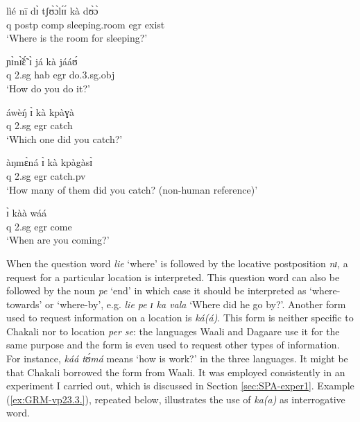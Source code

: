 \begin{exe}
\begin{exe}
\begin{exe}
{\begin{exe}
\begin{exe}
\begin{exe}
\begin{exe}
\begin{exe}
\begin{exe}
\begin{exe}
\begin{xlist}
\begin{exe}
\ex\label{ex:vp9.25}
\gll lìé nī dɪ̀ tʃʊ̀ɔ̀lɪ́ɪ́ kà dʊ̀ɔ̀ \\
        {\sc q} {\sc postp} {\sc comp} sleeping.room   {\sc egr} exist \\
\glt  `Where is the room for sleeping?' 



\ex\label{ex:vp22.4.1}
\gll ɲɪ̀nɪ̃̀ɛ̃́ ɪ̀ já kà jááʊ́ \\
      {\sc q}  {\sc 2.sg} {\sc hab}   {\sc egr} do.{\sc 3.sg.obj} \\
\glt  `How do you do it?' 



\ex\label{ex:vp22.4.4}
\gll áwèŋ́ ɪ̀ kà kpàɣà \\
      {\sc q}   {\sc 2.sg}  {\sc  egr}    catch  \\
\glt  `Which one did you catch?' 


\ex\label{ex:vp22.4.10}
\gll àŋmɛ̀ná ɪ̀ kà kpàgàsɪ̀ \\
         {\sc q}    {\sc 2.sg}  {\sc  egr}  catch.{\sc pv}  \\
\glt  `How many of them did you catch? (non-human reference)' 

\ex\label{ex:vp22.4.15}
 ɪ̀ kàà wáá \\
       {\sc q} {\sc 2.sg} {\sc  egr}    come \\
\glt  `When are you coming?' 
  
   
  \z 
 \z


When the question word {\it lie} `where' is  followed by the locative
postposition {\it nɪ},  a request for a particular location is interpreted. 
This question word can
also be
followed by the noun  {\it pe} `end' in which case it should be interpreted
as
`where-towards' or `where-by', e.g. {\it lie pe ɪ ka vala} `Where did he go
by?'.  Another form used to request information on a location is {\it ká(á)}.
This form is neither specific to Chakali nor to location {\it per se}:
the languages Waali and Dagaare use it for the same purpose and the
form is even used to request other types  of information. For instance, {\it 
káá tʊ́má} means `how is work?' in the three languages. It might be that
Chakali borrowed the form from Waali.  It was
employed consistently in an experiment I carried out, which is discussed  in
Section \ref{sec:SPA-exper1}. Example  (\ref{ex:GRM-vp23.3.}),  repeated below, 
illustrates the use of {\it ka(a)} as interrogative word.

\begin{exe}
 


\end{exe}
\end{exe}
\end{xlist}
\end{exe}
\end{exe}
\end{exe}
\end{exe}
\end{exe}
\end{exe}
\end{exe}}
\end{exe}
\end{exe}
\end{exe}
